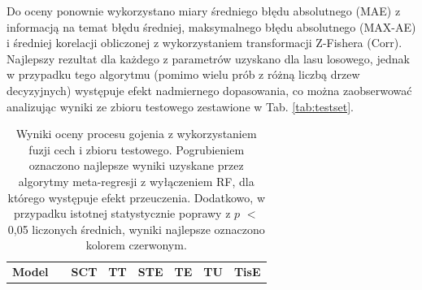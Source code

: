 Do oceny ponownie wykorzystano miary średniego błędu absolutnego (MAE) z informacją na temat błędu średniej, maksymalnego błędu absolutnego (MAX-AE) i średniej korelacji obliczonej z wykorzystaniem transformacji Z-Fishera (Corr). Najlepszy rezultat dla każdego z parametrów uzyskano dla lasu losowego, jednak w przypadku tego algorytmu (pomimo wielu prób z różną liczbą drzew decyzyjnych) występuje efekt nadmiernego dopasowania, co można zaobserwować analizując wyniki ze zbioru testowego zestawione w Tab. \ref{tab:testset}. 

\begin{table}[]
	\caption{Wyniki oceny procesu gojenia z wykorzystaniem fuzji cech i zbioru testowego. Pogrubieniem oznaczono najlepsze wyniki uzyskane przez algorytmy meta-regresji z wyłączeniem RF, dla którego występuje efekt przeuczenia. Dodatkowo, w przypadku istotnej statystycznie poprawy z $p$ $<$ 0,05 liczonych średnich, wyniki najlepsze oznaczono kolorem czerwonym.}
	\scriptsize
	\begin{center}
		\begin{tabular}{lc||c|c|c|c|c|c}
			\textbf{Model} & & \textbf{SCT} & \textbf{TT} & \textbf{STE} & \textbf{TE} & \textbf{TU} & \textbf{TisE}\\ 
			

\end{tabular}
\end{center}
\end{table}
